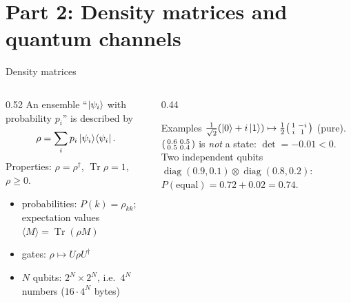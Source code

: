 \documentclass[aspectratio=169,11pt]{beamer}
\begin{document}
\section{Part 2: Density matrices and quantum channels}
\begin{frame}[label=fDM]{Density matrices}
  \begin{columns}[T]
    \begin{column}{0.52\textwidth}
      \small
      An ensemble ``$\ket{\psi_i}$ with probability $p_i$'' is described by
      \[ \rho = \sum_ip_i\ket{\psi_i}\!\bra{\psi_i}. \]
      Properties: $\rho = \rho^\dagger$, $\operatorname{Tr}\rho = 1$, $\rho \ge 0$.
      \begin{itemize}\itemsep1pt
        \item probabilities: $P(k) = \rho_{kk}$; expectation values $\langle M\rangle = \operatorname{Tr}(\rho M)$
        \item gates: $\rho \mapsto U\rho U^\dagger$
        \item $N$ qubits: $2^N\times2^N$, i.e.\ $4^N$ numbers ($16\cdot4^N$ bytes)
      \end{itemize}
    \end{column}
    \begin{column}{0.44\textwidth}
      \begin{exampleblock}{Examples}
        \scriptsize
        $\frac{1}{\sqrt2}(\ket0 + i\ket1) \mapsto \frac12\begin{psmallmatrix}1 & -i\\ i & 1\end{psmallmatrix}$ (pure).\\[3pt]
        $\begin{psmallmatrix}0.6 & 0.5\\ 0.5 & 0.4\end{psmallmatrix}$ is \emph{not} a state: $\det = -0.01 < 0$.\\[3pt]
        Two independent qubits $\operatorname{diag}(0.9, 0.1)\otimes\operatorname{diag}(0.8, 0.2)$: $P(\text{equal}) = 0.72 + 0.02 = 0.74$.
      \end{exampleblock}
    \end{column}
  \end{columns}
\end{frame}
\end{document}
